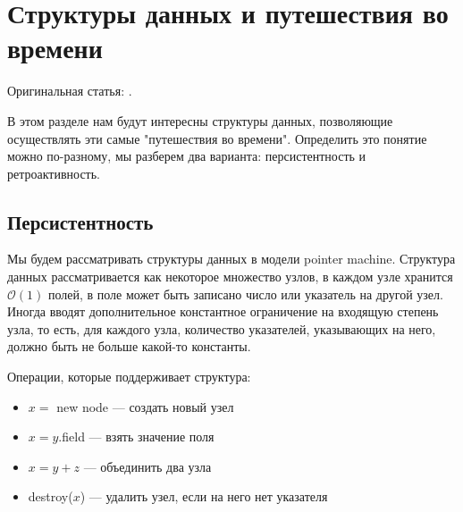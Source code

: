 \section{Структуры данных и путешествия во времени} 

Оригинальная статья: \cite{demaine2007retroactive}.

В этом разделе нам будут интересны структуры данных, позволяющие осуществлять эти самые "путешествия во времени".
Определить это понятие можно по-разному, мы разберем два варианта: персистентность и ретроактивность.

\subsection{Персистентность} \label{sec:persist}

Мы будем рассматривать структуры данных в модели pointer machine.
Структура данных рассматривается как некоторое множество узлов, в каждом узле хранится $\mathcal{O}(1)$ полей, в поле может быть записано число или указатель на другой узел.
Иногда вводят дополнительное константное ограничение на входящую степень узла, то есть, для каждого узла, количество указателей, указывающих на него, должно быть не больше какой-то константы.

\begin{figure}[h] \centering
{}
\end{figure}

\vspace{10pt}
Операции, которые поддерживает структура: 

\begin{itemize}

\item $x = $ new node --- создать новый узел
\item $x = y.$field --- взять значение поля
\item $x = y + z$ --- объединить два узла
\item destroy($x$) --- удалить узел, если на него нет указателя

\end{itemize}

